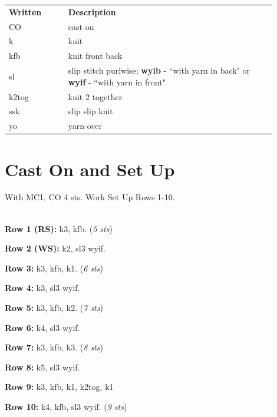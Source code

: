\documentclass[12pt]{article}
\renewcommand{\arraystretch}{2} %
\newcommand{\rowDir}[1]{\textbf{#1:}} %
\newcommand{\stitchcount}[1]{(\emph{#1 sts})}
\begin{document}
\begin{multicols}{2}
\begin{center}
{\renewcommand{\arraystretch}{1.5}
\begin{tabular}{| C{0.2\linewidth}  p{0.7\linewidth} | }
\thickhline {} 
\textbf{Written}	& \textbf{Description} \\ \thickhline
CO 	& cast on \\
k	& knit \\
kfb 	& knit front back \\
sl 	& slip stitch purlwise; \textbf{wyib} - ``with yarn in back" or \textbf{wyif} - ``with yarn in front" \\
k2tog 	& knit 2 together \\
ssk		& slip slip knit \\
yo		& yarn-over  \\
\hline
\end{tabular}
}

\end{center}


\vfill
\columnbreak

\section*{Cast On and Set Up}

With MC1, CO 4 sts. Work Set Up Rows 1-10.

~\\
\rowDir{Row 1 (RS)} k3, kfb. \stitchcount{5}

\rowDir{Row 2 (WS)} k2, sl3 wyif.

\rowDir{Row 3} k3, kfb, k1. \stitchcount{6}

\rowDir{Row 4} k3, sl3 wyif.

\rowDir{Row 5} k3, kfb, k2. \stitchcount{7}

\rowDir{Row 6} k4, sl3 wyif.

\rowDir{Row 7} k3, kfb, k3. \stitchcount{8}

\rowDir{Row 8} k5, sl3 wyif.

\rowDir{Row 9} k3, kfb, k1, k2tog, k1

\rowDir{Row 10} k4, kfb, sl3 wyif. \stitchcount{9}

\end{multicols}
\end{document}
